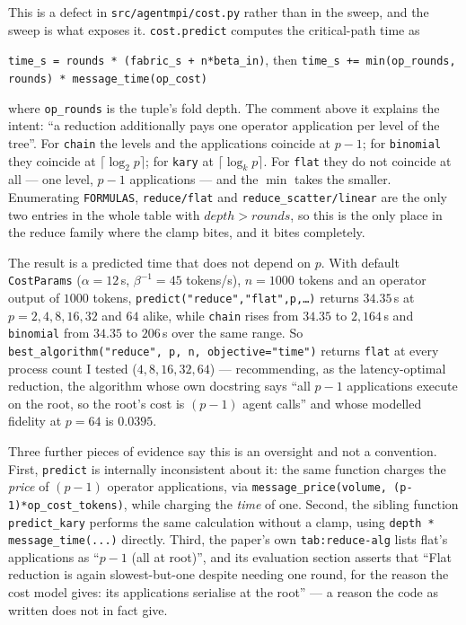 \documentclass[11pt]{article}
\begin{document}
This is a defect in \texttt{src/agentmpi/cost.py} rather than in the sweep, and the sweep is
what exposes it. \texttt{cost.predict} computes the critical-path time as

\begin{center}
\texttt{time\_s = rounds * (fabric\_s + n*beta\_in)}, then
\texttt{time\_s += min(op\_rounds, rounds) * message\_time(op\_cost)}
\end{center}

where \texttt{op\_rounds} is the tuple's fold depth. The comment above it explains the intent:
``a reduction additionally pays one operator application per level of the tree''. For
\texttt{chain} the levels and the applications coincide at $p-1$; for \texttt{binomial} they
coincide at $\lceil\log_2 p\rceil$; for \texttt{kary} at $\lceil\log_k p\rceil$. For
\texttt{flat} they do not coincide at all --- one level, $p-1$ applications --- and the
$\min$ takes the smaller. Enumerating \texttt{FORMULAS}, \texttt{reduce/flat} and
\texttt{reduce\_scatter/linear} are the only two entries in the whole table with
$\mathit{depth} > \mathit{rounds}$, so this is the only place in the reduce family where the
clamp bites, and it bites completely.

The result is a predicted time that does not depend on $p$. With default \texttt{CostParams}
($\alpha = 12$\,s, $\beta^{-1} = 45$ tokens/s), $n = 1000$ tokens and an operator output of
$1000$ tokens, \texttt{predict("reduce","flat",p,\dots)} returns $34.35$\,s at $p = 2, 4, 8,
16, 32$ and $64$ alike, while \texttt{chain} rises from $34.35$ to $2{,}164$\,s and
\texttt{binomial} from $34.35$ to $206$\,s over the same range. So
\texttt{best\_algorithm("reduce", p, n, objective="time")} returns \texttt{flat} at every
process count I tested ($4, 8, 16, 32, 64$) --- recommending, as the latency-optimal reduction,
the algorithm whose own docstring says ``all $p-1$ applications execute on the root, so the
root's cost is $(p-1)$ agent calls'' and whose modelled fidelity at $p=64$ is $0.0395$.

Three further pieces of evidence say this is an oversight and not a convention. First,
\texttt{predict} is internally inconsistent about it: the same function charges the
\emph{price} of $(p-1)$ operator applications, via
\texttt{message\_price(volume, (p-1)*op\_cost\_tokens)}, while charging the \emph{time} of one.
Second, the sibling function \texttt{predict\_kary} performs the same calculation without a
clamp, using \texttt{depth * message\_time(...)} directly. Third, the paper's own
\texttt{tab:reduce-alg} lists flat's applications as ``$p-1$ (all at root)'', and its evaluation
section asserts that ``Flat reduction is again slowest-but-one despite needing one round, for
the reason the cost model gives: its applications serialise at the root'' --- a reason the code
as written does not in fact give.
\end{document}

